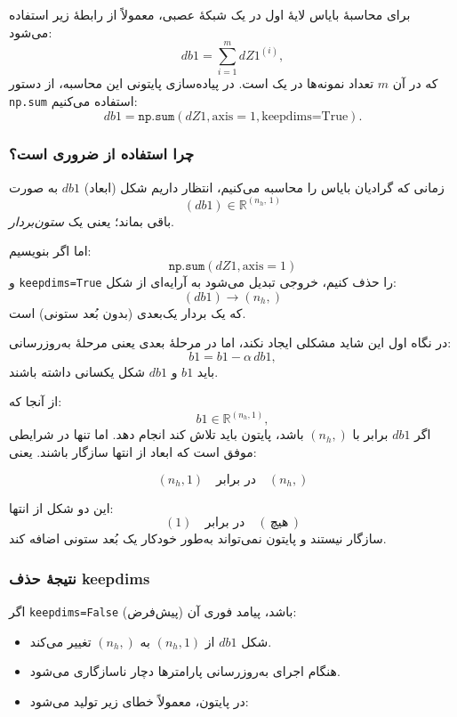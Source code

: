 \documentclass{article}
\begin{document}
\noindent
برای محاسبهٔ بایاس لایهٔ اول در یک شبکهٔ عصبی، معمولاً از رابطهٔ زیر استفاده می‌شود:
\[
db1 = \sum_{i=1}^{m} dZ1^{(i)},
\]
که در آن $m$ تعداد نمونه‌ها در یک  است. در پیاده‌سازی پایتونی این محاسبه، از دستور \texttt{np.sum} استفاده می‌کنیم:
\[
db1 = \texttt{np.sum}(dZ1, \text{axis}=1, \text{keepdims=True}).
\]

\subsubsection*{چرا استفاده از  ضروری است؟}

زمانی که گرادیان بایاس را محاسبه می‌کنیم، انتظار داریم شکل (ابعاد) $db1$ به صورت
\[
(db1) \in \mathbb{R}^{(n_{h},\,1)}
\]
باقی بماند؛ یعنی یک \textit{ستون‌بردار}.

اما اگر بنویسیم:
\[
\texttt{np.sum}(dZ1, \text{axis}=1)
\]
و \texttt{keepdims=True} را حذف کنیم، خروجی تبدیل می‌شود به آرایه‌ای از شکل:
\[
(db1) \to (n_{h},)
\]
که یک بردار یک‌بعدی (بدون بُعد ستونی) است.

در نگاه اول این شاید مشکلی ایجاد نکند، اما در مرحلهٔ بعدی یعنی مرحلهٔ به‌روزرسانی:
\[
b1 = b1 - \alpha \, db1,
\]
باید $b1$ و $db1$ شکل یکسانی داشته باشند.

از آنجا که:
\[
b1 \in \mathbb{R}^{(n_{h},1)},
\]
اگر $db1$ برابر با $(n_{h},)$ باشد، پایتون باید تلاش کند  انجام دهد. اما  تنها در شرایطی موفق است که ابعاد از انتها سازگار باشند. یعنی:

\[
(n_{h},1) \quad \text{در برابر} \quad (n_{h},)
\]

این دو شکل از انتها:
\[
(1) \quad \text{در برابر} \quad (\,\text{هیچ}\,)
\]
سازگار نیستند و پایتون نمی‌تواند به‌طور خودکار یک بُعد ستونی اضافه کند.

\subsubsection*{نتیجهٔ حذف keepdims}

اگر \texttt{keepdims=False} (پیش‌فرض) باشد، پیامد فوری آن:

\begin{itemize}
	\item شکل $db1$ از $(n_{h},1)$ به $(n_{h},)$ تغییر می‌کند.
	\item {} هنگام اجرای به‌روزرسانی پارامترها دچار ناسازگاری می‌شود.
	\item در پایتون، معمولاً خطای زیر تولید می‌شود:
	
	
\end{itemize}
\end{document}
